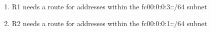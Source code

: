 \begin{enumerate}
    \item R1 needs a route for addresses within the fc00:0:0:3::/64 subnet
    \item R2 needs a route for addresses within the fc00:0:0:1::/64 subnet
\end{enumerate}
